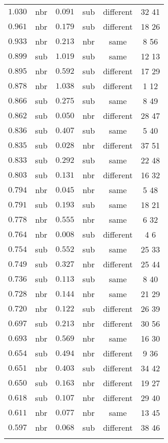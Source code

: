 \begin{table}[!htbp]
\begin{tabular}{@{\extracolsep{5pt}} cccccc}
$1.030$ & nbr & $0.091$ & sub & different & 32 41  \\ 
$0.961$ & nbr & $0.179$ & sub & different & 18 26  \\ 
$0.933$ & nbr & $0.213$ & nbr & same & 8 56  \\ 
$0.899$ & sub & $1.019$ & sub & same & 12 13  \\ 
$0.895$ & nbr & $0.592$ & sub & different & 17 29  \\ 
$0.878$ & nbr & $1.038$ & sub & different & 1 12  \\ 
$0.866$ & sub & $0.275$ & sub & same & 8 49  \\ 
$0.862$ & sub & $0.050$ & nbr & different & 28 47  \\ 
$0.836$ & sub & $0.407$ & sub & same & 5 40  \\ 
$0.835$ & sub & $0.028$ & nbr & different & 37 51  \\ 
$0.833$ & sub & $0.292$ & sub & same & 22 48  \\ 
$0.803$ & sub & $0.131$ & nbr & different & 16 32  \\ 
$0.794$ & nbr & $0.045$ & nbr & same & 5 48  \\ 
$0.791$ & sub & $0.193$ & sub & same & 18 21  \\ 
$0.778$ & nbr & $0.555$ & nbr & same & 6 32  \\ 
$0.764$ & nbr & $0.008$ & sub & different & 4 6  \\ 
$0.754$ & sub & $0.552$ & sub & same & 25 33  \\ 
$0.749$ & sub & $0.327$ & nbr & different & 25 44  \\ 
$0.736$ & sub & $0.113$ & sub & same & 8 40  \\ 
$0.728$ & nbr & $0.144$ & nbr & same & 21 29  \\ 
$0.720$ & nbr & $0.122$ & sub & different & 26 39  \\ 
$0.697$ & sub & $0.213$ & nbr & different & 30 56  \\ 
$0.693$ & nbr & $0.569$ & nbr & same & 16 30  \\ 
$0.654$ & sub & $0.494$ & nbr & different & 9 36  \\ 
$0.651$ & nbr & $0.403$ & sub & different & 34 42  \\ 
$0.650$ & sub & $0.163$ & nbr & different & 19 27  \\ 
$0.618$ & sub & $0.107$ & nbr & different & 29 40  \\ 
$0.611$ & nbr & $0.077$ & nbr & same & 13 45  \\ 
$0.597$ & nbr & $0.068$ & sub & different & 38 46  \\ 
\hline \\[-1.8ex] 
\end{tabular} 
\end{table} 
